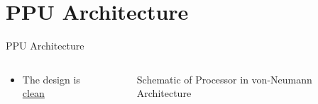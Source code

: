 \documentclass[10pt,aspectratio=169]{beamer}
\begin{document}
\section{PPU Architecture}
\begin{frame}{PPU Architecture}
    \begin{columns}[c]
    \begin{column}{0.5\textwidth}
        \begin{itemize}
            \item The design is \underline{clean}
        \end{itemize}
    \end{column}

    \begin{column}{0.5\textwidth}
        \centering
        \vspace*{3em}
        \begin{figure}
                \begin{adjustbox}{center, max width={.7\columnwidth}}
                    
                \end{adjustbox}
            \caption{\label{fig:processor} Schematic of Processor in von-Neumann Architecture}
        \end{figure}
    \end{column}
    \end{columns}

\end{frame}
\end{document}

